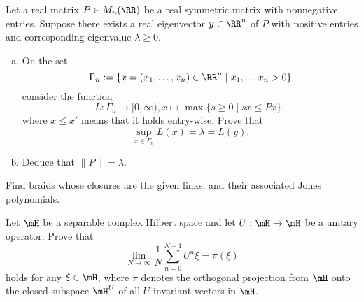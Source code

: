 \documentclass{article}
\begin{document}
 Let a real matrix $P \in M_n(\RR)$ be a real symmetric matrix with nonnegative entries.  Suppose there exists a real eigenvector $y \in \RR^n$ of $P$ with positive entries and corresponding eigenvalue $\lambda \ge 0$.
\begin{enumerate}[(a)]
\item On the set
  $$ \Gamma_n := \{ x = (x_1, \ldots, x_n) \in \RR^n \mid x_1, \ldots x_n > 0 \}$$ consider the function
  $$ L : \Gamma_n \to [0, \infty), x \mapsto \max\{s \ge 0 \mid sx \le Px \},$$
  where $x \le x'$ means that it holds entry-wise. Prove that
  $$\sup_{x \in \Gamma_n} L(x) = \lambda = L(y).$$

\item Deduce that $\|P \| = \lambda.$
\end{enumerate}

 Find braids whose closures are the given links, and their associated Jones polynomials.

 Let $\mH$ be a separable complex Hilbert space and let $U: \mH \to \mH$ be a unitary operator.  Prove that
$$ \lim_{N \to \infty} \frac{1}{N} \sum_{n = 0}^{N -1} U^n \xi = \pi(\xi)$$
holds for any $\xi \in \mH$, where $\pi$ denotes the orthogonal projection from $\mH$ onto the closed subspace $\mH^U$ of all $U$-invariant vectors in $\mH$.
\end{document}
